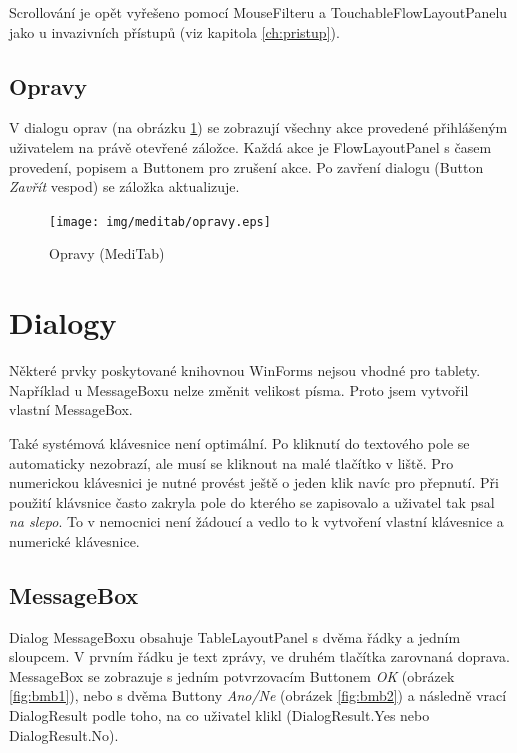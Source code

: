 Scrollování je opět vyřešeno pomocí MouseFilteru a TouchableFlowLayoutPanelu jako u invazivních přístupů (viz kapitola \ref{ch:pristup}).


\subsection{Opravy}

V dialogu oprav (na obrázku \ref{fig:opravy}) se zobrazují všechny akce provedené přihlášeným uživatelem na právě otevřené záložce. Každá akce je FlowLayoutPanel s časem provedení, popisem a Buttonem pro zrušení akce. Po zavření dialogu (Button \emph{Zavřít} vespod) se záložka aktualizuje.

\begin{figure}[H]
	\centering
	\texttt{[image: img/meditab/opravy.eps]}
	\caption{Opravy (MediTab)}
  \label{fig:opravy}
\end{figure}



\section{Dialogy}
\label{ch:dialogy}

Některé prvky poskytované knihovnou WinForms nejsou vhodné pro tablety. Například u MessageBoxu nelze změnit velikost písma. Proto jsem vytvořil vlastní MessageBox.

Také systémová klávesnice není optimální. Po kliknutí do textového pole se automaticky nezobrazí, ale musí se kliknout na malé tlačítko v liště. Pro numerickou klávesnici je nutné provést ještě o jeden klik navíc pro přepnutí. Při použití klávsnice často zakryla pole do kterého se zapisovalo a uživatel tak psal \emph{na slepo}. To v nemocnici není žádoucí a vedlo to k vytvoření vlastní klávesnice a numerické klávesnice.

\subsection{MessageBox}

Dialog MessageBoxu obsahuje TableLayoutPanel s dvěma řádky a jedním sloupcem. V prvním řádku je text zprávy, ve druhém tlačítka zarovnaná doprava. MessageBox se zobrazuje s jedním potvrzovacím Buttonem \emph{OK} (obrázek \ref{fig:bmb1}), nebo s dvěma Buttony \emph{Ano/Ne} (obrázek \ref{fig:bmb2}) a následně vrací DialogResult podle toho, na co uživatel klikl (DialogResult.Yes nebo DialogResult.No).

